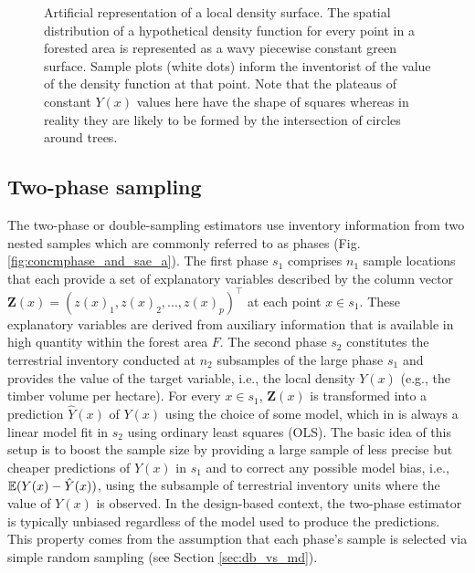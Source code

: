 \begin{figure}[htb]
\centering
{}
\caption{Artificial representation of a local density surface. The spatial distribution of a hypothetical density function for every point in a forested area is represented as a wavy piecewise constant green surface.  Sample plots (white dots) inform the inventorist of the value of the density function at that point. Note that the plateaus of constant $Y(x)$ values here have the shape of squares whereas in reality they are likely to be formed by the intersection of circles around trees.}
\label{fig:inf_pop_apr}
\end{figure}


\subsection{Two-phase sampling}

The two-phase or double-sampling estimators use inventory information from two nested samples which are commonly referred to as phases (Fig. \ref{fig:concmphase_and_sae_a}). The first phase $s_1$ comprises $n_1$ sample locations that each provide a set of explanatory variables described by the column vector $\pmb{Z}(x)=(z(x)_1, z(x)_2,...,z(x)_p)^{\top}$ at each point $x \in s_1$. These explanatory variables are derived from auxiliary information that is available in high quantity within the forest area $F$. The second phase $s_2$ constitutes the terrestrial inventory conducted at $n_2$ subsamples of the large phase $s_1$ and provides the value of the target variable, i.e., the local density $Y(x)$ (e.g., the timber volume per hectare). For every $x \in s_1$, $\pmb{Z}(x)$ is transformed into a prediction $\hat{Y}(x)$ of $Y(x)$ using the choice of some model, which in  is always a linear model fit in $s_2$ using ordinary least squares (OLS). The basic idea of this setup is to boost the sample size by providing a large sample of less precise but cheaper predictions of $Y(x)$ in $s_1$ and to correct any possible model bias, i.e., $\mathbb{E}{(Y(x)-\hat{Y}(x))}$, using the subsample of terrestrial inventory units where the value of $Y(x)$ is observed. In the design-based context, the two-phase estimator is typically unbiased regardless of the model used to produce the predictions. This property comes from the assumption that each phase's sample is selected via simple random sampling (see Section \ref{sec:db_vs_md}).



